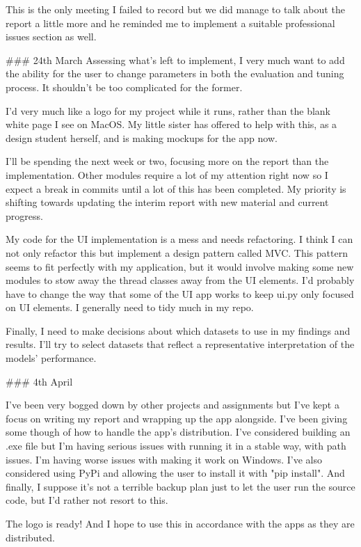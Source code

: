\documentclass[letterpaper,10pt]{article}
\begin{document}
\begin{markdown}
This is the only meeting I failed to record but we did manage to talk about the report a little more and he reminded me to implement a suitable professional issues section as well.

### 24th March
Assessing what's left to implement, I very much want to add the ability for the user to change parameters in both the evaluation and tuning process. It shouldn't be too complicated for the former.
  
I'd very much like a logo for my project while it runs, rather than the blank white page I see on MacOS. My little sister has offered to help with this, as a design student herself, and is making mockups for the app now.
  
I'll be spending the next week or two, focusing more on the report than the implementation. Other modules require a lot of my attention right now so I expect a break in commits until a lot of this has been completed. My priority is shifting towards updating the interim report with new material and current progress. 
  
My code for the UI implementation is a mess and needs refactoring. I think I can not only refactor this but implement a design pattern called MVC. This pattern seems to fit perfectly with my application, but it would involve making some new modules to stow away the thread classes away from the UI elements. I'd probably have to change the way that some of the UI app works to keep ui.py only focused on UI elements. I generally need to tidy much in my repo.
  
Finally, I need to make decisions about which datasets to use in my findings and results. I'll try to select datasets that reflect a representative interpretation of the models' performance. 

### 4th April

I've been very bogged down by other projects and assignments but I've kept a focus on writing my report and wrapping up the app alongside. I've been giving some though of how to handle the app's distribution. I've considered building an .exe file but I'm having serious issues with running it in a stable way, with path issues. I'm having worse issues with making it work on Windows. I've also considered using PyPi and allowing the user to install it with "pip install". And finally, I suppose it's not a terrible backup plan just to let the user run the source code, but I'd rather not resort to this.  
  
The logo is ready! And I hope to use this in accordance with the apps as they are distributed.
  

\end{markdown}
\end{document}
